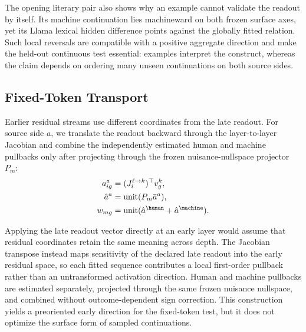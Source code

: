 The opening literary pair also shows why an example cannot validate the readout by itself. Its machine continuation lies machineward on both frozen surface axes, yet its Llama lexical hidden difference points against the globally fitted relation. Such local reversals are compatible with a positive aggregate direction and make the held-out continuous test essential: examples interpret the construct, whereas the claim depends on ordering many unseen continuations on both source sides.

\subsection{Fixed-Token Transport}

Earlier residual streams use different coordinates from the late readout. For source side \(a\), we translate the readout backward through the layer-to-layer Jacobian and combine the independently estimated human and machine pullbacks only after projecting through the frozen nuisance-nullspace projector \(P_m\):
\begin{equation}
\begin{aligned}
a_{ig}^{a}&=(J_i^{\ell\rightarrow k})^\top v_g^k,\\
\hat a^a&=\operatorname{unit}(P_m\bar a^a),\\
w_{mg}&=\operatorname{unit}(\hat a^\human+\hat a^\machine).
\end{aligned}
\label{eq:pullback-main}
\end{equation}

Applying the late readout vector directly at an early layer would assume that residual coordinates retain the same meaning across depth. The Jacobian transpose instead maps sensitivity of the declared late readout into the early residual space, so each fitted sequence contributes a local first-order pullback rather than an untransformed activation direction. Human and machine pullbacks are estimated separately, projected through the same frozen nuisance nullspace, and combined without outcome-dependent sign correction. This construction yields a preoriented early direction for the fixed-token test, but it does not optimize the surface form of sampled continuations.

